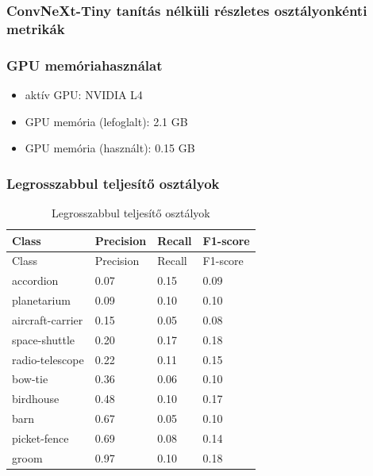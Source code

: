 \subsubsection{ConvNeXt-Tiny tanítás nélküli részletes osztályonkénti metrikák}
  

\subsubsection{GPU memóriahasználat}
\begin{itemize}
  \item aktív GPU: NVIDIA L4
  \item GPU memória (lefoglalt): 2.1 GB
  \item GPU memória (használt):  0.15 GB
\end{itemize}

\subsubsection{Legrosszabbul teljesítő osztályok}
\begin{center}
  \begin{longtable}{llll}
  \caption{Legrosszabbul teljesítő osztályok}\label{tab:phase01_ConvNeXt-Tiny_legrosszabb_osztlyok}\\
  \toprule
  Class & Precision & Recall & F1-score \\
  \midrule
  \endfirsthead
  \toprule
  Class & Precision & Recall & F1-score \\
  \midrule
  \endhead
  accordion & 0.07 & 0.15 & 0.09 \\
  planetarium & 0.09 & 0.10 & 0.10 \\
  aircraft-carrier & 0.15 & 0.05 & 0.08 \\
  space-shuttle & 0.20 & 0.17 & 0.18 \\
  radio-telescope & 0.22 & 0.11 & 0.15 \\
  bow-tie & 0.36 & 0.06 & 0.10 \\
  birdhouse & 0.48 & 0.10 & 0.17 \\
  barn & 0.67 & 0.05 & 0.10 \\
  picket-fence & 0.69 & 0.08 & 0.14 \\
  groom & 0.97 & 0.10 & 0.18 \\
  \bottomrule
  \end{longtable}
  \end{center}
  